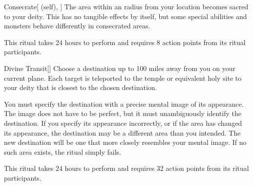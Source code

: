 \lowercase{\hypertarget{spell:Consecrate}{}}\label{spell:Consecrate}
\begin{attuneability}[Rank 3]{\hypertarget{spell:Consecrate}{Consecrate}}[ (self), ]
\targetrule
The area within an \arealarge radius  from your location becomes sacred to your deity.
This has no tangible effects by itself, but some special abilities and monsters behave differently in consecrated areas.

This ritual takes 24 hours to perform and requires 8 action points from its ritual participants.
\end{attuneability}
\vspace{0.25em}



\lowercase{\hypertarget{spell:Divine Transit}{}}\label{spell:Divine Transit}
\begin{apability}[Rank 5]{\hypertarget{spell:Divine Transit}{Divine Transit}}[]
Choose a destination up to 100 miles away from you on your current plane.
Each target is teleported to the temple or equivalent holy site to your deity that is closest to the chosen destination.

You must specify the destination with a precise mental image of its appearance.
The image does not have to be perfect, but it must unambiguously identify the destination.
If you specify its appearance incorrectly, or if the area has changed its appearance, the destination may be a different area than you intended.
The new destination will be one that more closely resembles your mental image.
If no such area exists, the ritual simply fails.

This ritual takes 24 hours to perform and requires 32 action points from its ritual participants.
\end{apability}
\vspace{0.25em}


